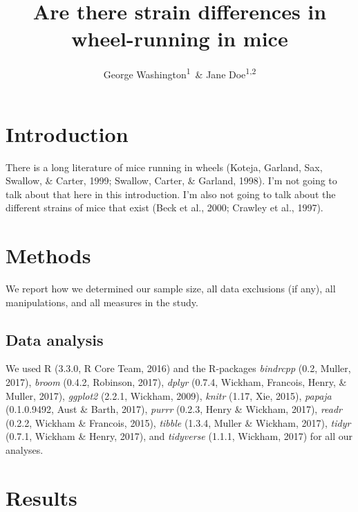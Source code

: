 \documentclass[english,man]{apa6}
\title{Are there strain differences in wheel-running in mice}
\author{George Washington\textsuperscript{1}~\& Jane Doe\textsuperscript{1,2}}
\affiliation{
    \vspace{0.5cm}
          \textsuperscript{1} Jupiter Research University\\
          \textsuperscript{2} Institue of Neuroscience, University of Life  }
\theoremstyle{definition}
\theoremstyle{definition}
\theoremstyle{definition}
\theoremstyle{remark}
\begin{document}
\maketitle

\setcounter{secnumdepth}{0}



\section{Introduction}\label{introduction}

There is a long literature of mice running in wheels (Koteja, Garland,
Sax, Swallow, \& Carter, 1999; Swallow, Carter, \& Garland, 1998). I'm
not going to talk about that here in this introduction. I'm also not
going to talk about the different strains of mice that exist (Beck et
al., 2000; Crawley et al., 1997).

\section{Methods}\label{methods}

We report how we determined our sample size, all data exclusions (if
any), all manipulations, and all measures in the study.

\subsection{Data analysis}\label{data-analysis}

We used R (3.3.0, R Core Team, 2016) and the R-packages \emph{bindrcpp}
(0.2, Muller, 2017), \emph{broom} (0.4.2, Robinson, 2017), \emph{dplyr}
(0.7.4, Wickham, Francois, Henry, \& Muller, 2017), \emph{ggplot2}
(2.2.1, Wickham, 2009), \emph{knitr} (1.17, Xie, 2015), \emph{papaja}
(0.1.0.9492, Aust \& Barth, 2017), \emph{purrr} (0.2.3, Henry \&
Wickham, 2017), \emph{readr} (0.2.2, Wickham \& Francois, 2015),
\emph{tibble} (1.3.4, Muller \& Wickham, 2017), \emph{tidyr} (0.7.1,
Wickham \& Henry, 2017), and \emph{tidyverse} (1.1.1, Wickham, 2017) for
all our analyses.

\newpage

\section{Results}\label{results}
\end{document}
